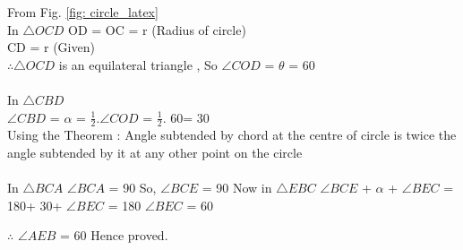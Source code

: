 \noindent From Fig. \ref{fig: circle_latex}\\
    In $\triangle OCD$  \newline 
    OD = OC = r (Radius of circle) \\
    CD = r (Given)\\
   
    $\therefore \triangle OCD $ is an equilateral triangle , \newline
    So  $\angle COD $ = $\theta$ = 60\degree
    \\
    \\
  
    In $\triangle CBD$  \\
    $\angle CBD$ = $\alpha$ = $\frac{1}{2}$.$\angle COD$ = $\frac{1}{2}$. 60\degree = 30\degree \\
  Using the Theorem : Angle subtended by chord at the centre of circle is twice the angle subtended by it at any other point on the circle
    \\
    \\
    In $\triangle BCA$ \newline
    $\angle BCA$ = 90
    \newline
    So, $\angle BCE$ = 90\degree
    \newline
    \newline
    Now in $\triangle EBC$ \newline
    $\angle BCE$ + $\alpha$ + $\angle BEC$ = 180\degree + 30\degree + $\angle BEC$ = 180\degree \newline
    $\angle BEC$ = 60\degree \newline
    
   $\therefore$ $\angle AEB$ = 60\degree \newline
   Hence proved.
    
    
       